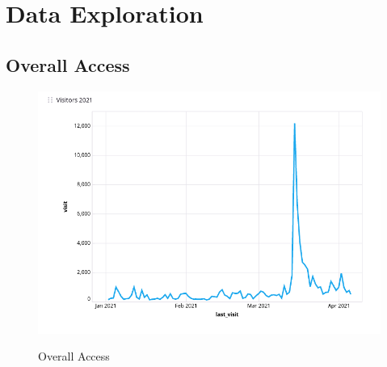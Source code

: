 %
%

\pagebreak
\section{Data Exploration}

\onehalfspacing

\subsection{Overall Access}


\begin{figure}[H]
\centering
\caption {Overall Access}
\includegraphics[width=\linewidth]{images/figure01.png}
\label{fig:accessOverall}
\end{figure}


